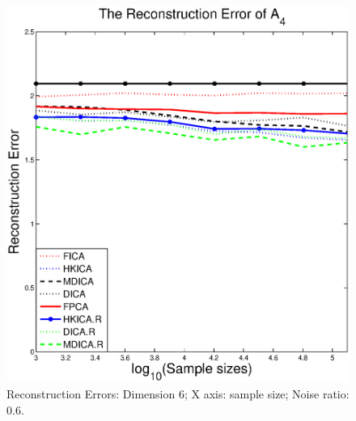 \begin{figure}[t]
	\includegraphics[width =0.45\columnwidth]{error4_sample_noise6}
\caption{
\label{fig:Error_sample_noise6}
 Reconstruction Errors: Dimension 6; X axis: sample size; Noise ratio: 0.6.}
\end{figure}


